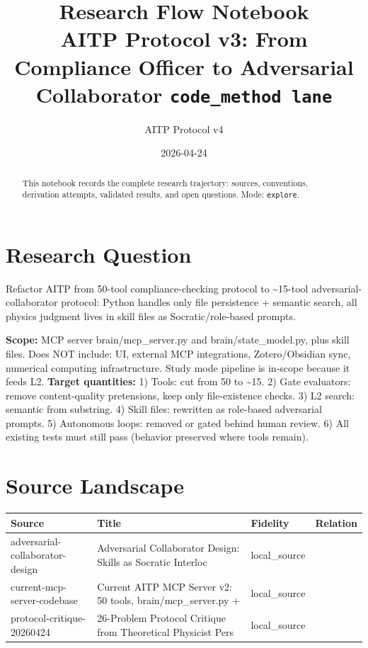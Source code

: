 \documentclass[11pt,a4paper]{article}
\title{\textbf{Research Flow Notebook}\\[0.4em]
  \large AITP Protocol v3: From Compliance Officer to Adversarial Collaborator
  \quad \texttt{code\_method lane}
}
\author{AITP Protocol v4}
\date{2026-04-24}
\begin{document}
\maketitle
\begin{abstract}
This notebook records the complete research trajectory: sources, conventions,
derivation attempts, validated results, and open questions.
Mode: \texttt{explore}.
\end{abstract}

\tableofcontents
\newpage
\section{Research Question}

\begin{resultbox}
Refactor AITP from 50-tool compliance-checking protocol to \textasciitilde 15-tool adversarial-collaborator protocol: Python handles only file persistence + semantic search, all physics judgment lives in skill files as Socratic/role-based prompts.
\end{resultbox}

\noindent
\textbf{Scope:} MCP server brain/mcp\_server.py and brain/state\_model.py, plus skill files. Does NOT include: UI, external MCP integrations, Zotero/Obsidian sync, numerical computing infrastructure. Study mode pipeline is in-scope because it feeds L2. \quad
\textbf{Target quantities:} 1) Tools: cut from 50 to \textasciitilde 15. 2) Gate evaluators: remove content-quality pretensions, keep only file-existence checks. 3) L2 search: semantic from substring. 4) Skill files: rewritten as role-based adversarial prompts. 5) Autonomous loops: removed or gated behind human review. 6) All existing tests must still pass (behavior preserved where tools remain).

\section{Source Landscape}

\begin{longtable}{>{\raggedright}p{3cm} p{5cm} p{2.5cm} p{2.5cm}}
\toprule
\textbf{Source} & \textbf{Title} & \textbf{Fidelity} & \textbf{Relation} \\
\midrule
\endhead
adversarial-collaborator-design & Adversarial Collaborator Design: Skills as Socratic Interloc & local\_source &  \\
current-mcp-server-codebase & Current AITP MCP Server v2: 50 tools, brain/mcp\_server.py +  & local\_source &  \\
protocol-critique-20260424 & 26-Problem Protocol Critique from Theoretical Physicist Pers & local\_source &  \\
\bottomrule
\end{longtable}
\end{document}
